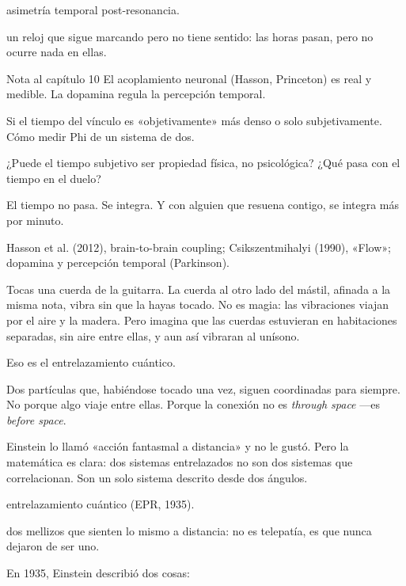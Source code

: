 \begin{fisica}
 asimetría temporal post-resonancia.

 un reloj que sigue marcando pero no tiene sentido: las horas pasan, pero no ocurre nada en ellas.
\end{fisica}
\begin{notacap}{Nota al capítulo 10}
 El acoplamiento neuronal (Hasson, Princeton) es real y medible. La dopamina regula la percepción temporal.

 Si el tiempo del vínculo es «objetivamente» más denso o solo subjetivamente. Cómo medir Phi de un sistema de dos.

 ¿Puede el tiempo subjetivo ser propiedad física, no psicológica? ¿Qué pasa con el tiempo en el duelo?

 El tiempo no pasa. Se integra. Y con alguien que resuena contigo, se integra más por minuto.

 Hasson et al. (2012), brain-to-brain coupling; Csikszentmihalyi (1990), «Flow»; dopamina y percepción temporal (Parkinson).
\end{notacap}
\noindent {}

Tocas una cuerda de la guitarra. La cuerda al otro lado del mástil, afinada a la misma nota, vibra sin que la hayas tocado. No es magia: las vibraciones viajan por el aire y la madera. Pero imagina que las cuerdas estuvieran en habitaciones separadas, sin aire entre ellas, y aun así vibraran al unísono.

Eso es el entrelazamiento cuántico.

Dos partículas que, habiéndose tocado una vez, siguen coordinadas para siempre. No porque algo viaje entre ellas. Porque la conexión no es \emph{through space} —es \emph{before space}.

Einstein lo llamó «acción fantasmal a distancia» y no le gustó. Pero la matemática es clara: dos sistemas entrelazados no son dos sistemas que correlacionan. Son un solo sistema descrito desde dos ángulos.

\begin{fisica}
 entrelazamiento cuántico (EPR, 1935).

 dos mellizos que sienten lo mismo a distancia: no es telepatía, es que nunca dejaron de ser uno.
\end{fisica}
\noindent En 1935, Einstein describió dos cosas:

